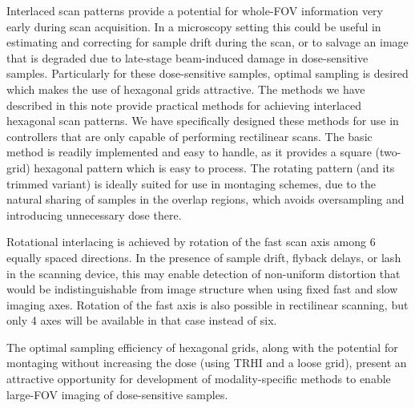 \documentclass{article}
\begin{document}
Interlaced scan patterns provide a potential for whole-FOV information very
early during scan acquisition.
%
In a microscopy setting this could be useful in estimating and correcting for sample drift during the scan, or to salvage an image that is degraded due to late-stage beam-induced damage in dose-sensitive samples.
%
Particularly for these dose-sensitive samples, optimal sampling is desired which makes the use of hexagonal grids attractive.
%
The methods we have described in this note provide practical methods for achieving interlaced hexagonal scan patterns.
%
We have specifically designed these methods for use in controllers that are only
capable of performing rectilinear scans.
%
The basic method is readily implemented and easy to handle, as it provides a square (two-grid) hexagonal pattern which is easy to process.
%
The rotating pattern (and its trimmed variant) is ideally suited for use in montaging schemes, due to the natural sharing of samples in the overlap regions, which avoids oversampling and introducing unnecessary dose there.
%


Rotational interlacing is achieved by rotation of the fast scan axis among 6
equally spaced directions.
%
In the presence of sample drift, flyback delays, or lash in the scanning device,
this may enable detection of non-uniform distortion that would be
indistinguishable from image structure when using fixed fast and slow imaging
axes.
%
Rotation of the fast axis is also possible in rectilinear scanning, but only 4
axes will be available in that case instead of six.


The optimal sampling efficiency of hexagonal grids, along with the potential for
montaging without increasing the dose (using TRHI and a loose grid), present an
attractive opportunity for development of modality-specific methods to enable
large-FOV imaging of dose-sensitive samples.



\end{document}

